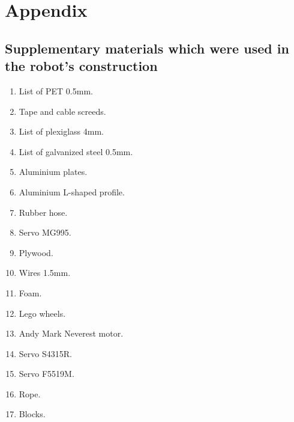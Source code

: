 \section{Appendix}
\subsection{Supplementary materials which were used in the robot's construction}

\begin{enumerate}
	\item List of PET 0.5mm.
	\item Tape and cable screeds.
	\item List of plexiglass 4mm.
	\item List of galvanized steel 0.5mm.
	\item Aluminium plates.
	\item Aluminium L-shaped profile.
	\item Rubber hose.
	\item Servo MG995.
	\item Plywood.
	\item Wires 1.5mm.
	\item Foam.
	\item Lego wheels.
	\item Andy Mark Neverest motor.
	\item Servo S4315R.
	\item Servo F5519M.
	\item Rope.
	\item Blocks.
\end{enumerate}
\fillpage



